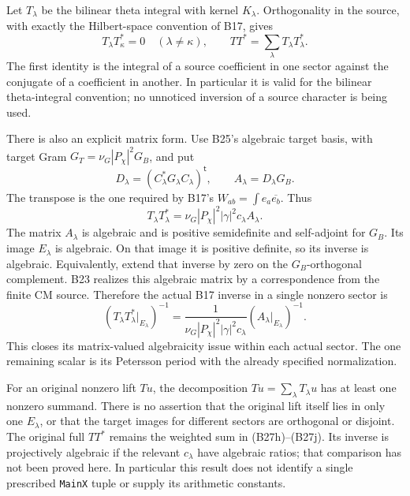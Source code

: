 \documentclass[11pt]{article}
\theoremstyle{definition}\newtheorem{definition}[theorem]{Definition}\newtheorem{remark}[theorem]{Remark}
\begin{document}
Let $T_\lambda$ be the bilinear theta integral with kernel
$K_\lambda$.  Orthogonality in the source, with exactly
the Hilbert-space convention of B17, gives
\[
 T_\lambda T_\kappa^*=0\quad(\lambda\ne\kappa),
       \qquad TT^*=\sum_\lambda T_\lambda T_\lambda^*.
 \tag{B27h}
\]
The first identity is the integral of a source coefficient
in one sector against the conjugate of a coefficient in
another.  In particular it is valid for the bilinear
theta-integral convention; no unnoticed inversion of a
source character is being used.

There is also an explicit matrix form.  Use B25's algebraic
target basis, with target Gram
$G_T=\nu_G|P_\chi|^2G_B$, and put
\[
 D_\lambda=(C_\lambda^*G_\lambda C_\lambda)^{\mathsf t},
       \qquad A_\lambda=D_\lambda G_B.
 \tag{B27i}
\]
The transpose is the one required by B17's
$W_{ab}=\int e_a\overline{e_b}$.  Thus
\[
 T_\lambda T_\lambda^*
   =\nu_G|P_\chi|^2|\gamma|^2c_\lambda A_\lambda.
 \tag{B27j}
\]
The matrix $A_\lambda$ is algebraic and is positive
semidefinite and self-adjoint for $G_B$.  Its image
$E_\lambda$ is algebraic.  On that image it is positive
definite, so its inverse is algebraic.  Equivalently,
extend that inverse by zero on the $G_B$-orthogonal
complement.  B23 realizes this algebraic matrix by a
correspondence from the finite CM source.  Therefore the
actual B17 inverse in a single nonzero sector is
\[
 (T_\lambda T_\lambda^*|_{E_\lambda})^{-1}
   =\frac{1}{\nu_G|P_\chi|^2|\gamma|^2c_\lambda}
                          (A_\lambda|_{E_\lambda})^{-1}.
 \tag{B27k}
\]
This closes its matrix-valued algebraicity issue within
each actual sector.  The one remaining scalar is its
Petersson period with the already specified normalization.

For an original nonzero lift $Tu$, the decomposition
$Tu=\sum_\lambda T_\lambda u$ has at least one nonzero
summand.  There is no assertion that the original lift
itself lies in only one $E_\lambda$, or that the target
images for different sectors are orthogonal or disjoint.
The original full $TT^*$ remains the weighted sum in
(B27h)--(B27j).  Its inverse is projectively algebraic
if the relevant $c_\lambda$ have algebraic ratios;
that comparison has not been proved here.  In particular
this result does not identify a single prescribed
\texttt{MainX} tuple or supply its arithmetic constants.
\end{document}
